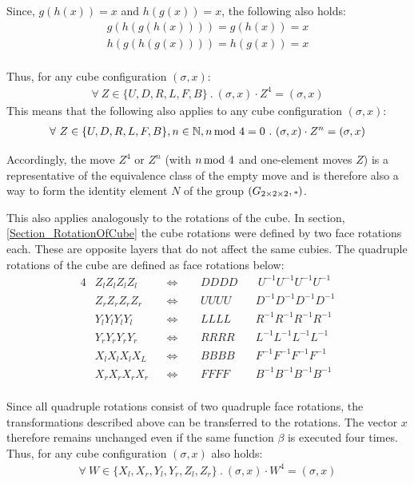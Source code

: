 \documentclass[12pt,a4paper]{article}
\theoremstyle{custom}
\newcommand{\Gtwo}{\ensuremath{G_{2\times 2\times 2}}}
\begin{document}
Since, $g(h(x))=x$ and $h(g(x))=x$, the following also holds:
\begin{align*}
		g(h(g(h(x)))) = g(h(x)) = x \\
			h(g(h(g(x)))) = h(g(x)) = x \\
	  \end{align*}

Thus, for any cube configuration $(\sigma, x)$:
\begin{align*}
\forall \ Z \in \{U, D, R, L, F, B\} \ . \ (\sigma, x) \cdot Z^4 = (\sigma, x)
\end{align*}
This means that the following also applies to any cube configuration $(\sigma, x)$:
\begin{align*}
\forall \ Z \in \{U, D, R, L, F, B\}, n \in \mathbb{N}, n \hspace*{-0.5em} \mod 4 = 0 \ . \ (\sigma, x) \cdot Z^n = (\sigma, x)
\end{align*}

Accordingly, the move $Z^4$ or $Z^n$ (with $n \hspace*{-0.5em} \mod 4$ and one-element moves $Z$) is a representative of the equivalence class of the empty move and is therefore also a way to form the identity element $N$ of the group $(\Gtwo, \mathlarger{\scriptstyle*})$.

This also applies analogously to the rotations of the cube. In section, \ref{Section_RotationOfCube} the cube rotations were defined by two face rotations each. These are opposite layers that do not affect the same cubies. 
\newpage The quadruple rotations of the cube are defined as face rotations below:
\begin{alignat*}{4}
& Z_lZ_lZ_lZ_l && \Leftrightarrow \ \ &&  DDDD  && \ U^{-1} U^{-1} U^{-1} U^{-1} \\
& Z_rZ_rZ_rZ_r && \Leftrightarrow &&   UUUU  && D^{-1}D^{-1}D^{-1}D^{-1}\\
& Y_lY_lY_lY_l && \Leftrightarrow && LLLL &&  R^{-1}R^{-1}R^{-1}R^{-1} \\
& Y_rY_rY_rY_r && \Leftrightarrow &&  RRRR &&  L^{-1} L^{-1} L^{-1} L^{-1} \\
& X_lX_lX_lX_L && \Leftrightarrow && BBBB &&  F^{-1}F^{-1}F^{-1}F^{-1} \\
& X_rX_rX_rX_r && \Leftrightarrow && FFFF  && B^{-1}B^{-1}B^{-1}B^{-1}   \\
\end{alignat*}

Since all quadruple rotations consist of two quadruple face rotations, the transformations described above can be transferred to the rotations. The vector $x$ therefore remains unchanged even if the same function $\beta$ is executed four times. Thus, for any cube configuration $(\sigma, x)$ also holds:
\begin{align*}
\forall \ W \in \{X_l, X_r, Y_l, Y_r, Z_l, Z_r\} \ . \ (\sigma, x) \cdot W^4 = (\sigma, x)
\end{align*}
\newpage
\end{document}
